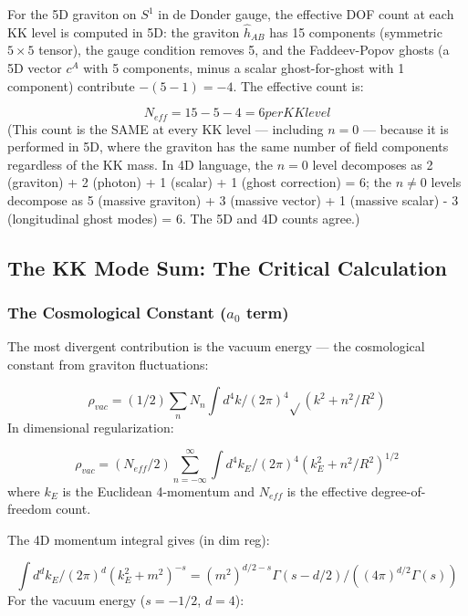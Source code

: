 \documentclass[aps,prd,preprint,superscriptaddress,longbibliography,floatfix]{revtex4-2}
\theoremstyle{remark}
\begin{document}
For the 5D graviton on $S^{1}$ in de Donder gauge, the effective DOF count at each KK level is computed in 5D: the graviton $\hat{h}_{AB}$ has 15 components (symmetric $5\times5$ tensor), the gauge condition removes 5, and the Faddeev-Popov ghosts (a 5D vector $c^A$ with 5 components, minus a scalar ghost-for-ghost with 1 component) contribute $-(5 - 1) = -4$. The effective count is:


\begin{equation}
    N_{eff} = 15 - 5 - 4 = 6 per KK level
\end{equation}
(This count is the SAME at every KK level --- including $n = 0$ --- because it is performed in 5D, where the graviton has the same number of field components regardless of the KK mass. In 4D language, the $n = 0$ level decomposes as 2 (graviton) + 2 (photon) + 1 (scalar) + 1 (ghost correction) = 6; the $n \neq 0$ levels decompose as 5 (massive graviton) + 3 (massive vector) + 1 (massive scalar) - 3 (longitudinal ghost modes) = 6. The 5D and 4D counts agree.)



\subsection{The KK Mode Sum: The Critical Calculation}


\subsubsection{The Cosmological Constant ($a_{0}$ term)}

The most divergent contribution is the vacuum energy --- the cosmological constant from graviton fluctuations:


\begin{equation}
    \rho_{vac} = (1/2) \sum_n N_n \int d^{4}k/(2\pi)^{4} \sqrt{}(k^{2} + n^{2}/R^{2})
\end{equation}
In dimensional regularization:


\begin{equation}
    \rho_{vac} = (N_{eff}/2) \sum_{n=-\infty}^{\infty} \int d^{4}k_E/(2\pi)^{4} (k_E^{2} + n^{2}/R^{2})^{1/2}
\end{equation}
where $k_E$ is the Euclidean 4-momentum and $N_{eff}$ is the effective degree-of- freedom count.

The 4D momentum integral gives (in dim reg):


\begin{equation}
    \int d^d k_E/(2\pi)^d (k_E^{2} + m^{2})^{-s} = (m^{2})^{d/2-s} \Gamma(s-d/2) / ((4\pi)^{d/2} \Gamma(s))
\end{equation}
For the vacuum energy ($s = -1/2$, $d = 4$):
\end{document}
